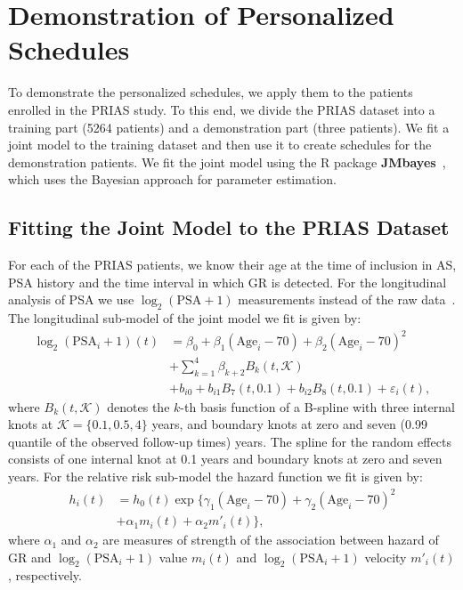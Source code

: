 \section{Demonstration of Personalized Schedules}
\label{c2:sec:pers_schedule_PRIAS}
To demonstrate the personalized schedules, we apply them to the patients enrolled in the PRIAS study. To this end, we divide the PRIAS dataset into a training part (5264 patients) and a demonstration part (three patients). We fit a joint model to the training dataset and then use it to create schedules for the demonstration patients. We fit the joint model using the R package \textbf{JMbayes}~\citep{rizopoulosJMbayes}, which uses the Bayesian approach for parameter estimation.

\subsection{Fitting the Joint Model to the PRIAS Dataset}
\label{c2:subsec:jm_fit_prias}
For each of the PRIAS patients, we know their age at the time of inclusion in AS, PSA history and the time interval in which GR is detected. For the longitudinal analysis of PSA we use $\log_2 (\mbox{PSA} + 1)$ measurements instead of the raw data~\citep{lin2000latent,pearson1994mixed}. The longitudinal sub-model of the joint model we fit is given by:
\begin{equation}
\label{c2:eq:long_model_prias}
\begin{split}
    \log_2 (\mbox{PSA}_i + 1)(t) &= \beta_0 + \beta_1 (\mbox{Age}_i-70) + \beta_2 (\mbox{Age}_i-70)^2\\ &+ \sum_{k=1}^4 \beta_{k+2} B_k(t,\mathcal{K})\\ 
    &+  b_{i0} + b_{i1} B_7(t, 0.1) + b_{i2} B_8(t, 0.1) +
    \varepsilon_i(t),
\end{split}
\end{equation}
where $B_k(t, \mathcal{K})$ denotes the $k$-th basis function of a B-spline with three internal knots at $\mathcal{K} =\{0.1, 0.5, 4\}$ years, and boundary knots at zero and seven (0.99 quantile of the observed follow-up times) years. The spline for the random effects consists of one internal knot at 0.1 years and boundary knots at zero and seven years. For the relative risk sub-model the hazard function we fit is given by:
\begin{equation}
\label{c2:eq:hazard_prias}
\begin{split}
h_i(t) &= h_0(t) \exp\big\{\gamma_1 (\mbox{Age}_i-70) + \gamma_2 (\mbox{Age}_i-70)^2 \\&+ \alpha_1 m_i(t) + \alpha_2 m'_i(t)\big\},
\end{split}
\end{equation}
where $\alpha_1$ and $\alpha_2$ are measures of strength of the association between hazard of GR and $\log_2 (\mbox{PSA}_i + 1)$ value $m_i(t)$ and $\log_2 (\mbox{PSA}_i + 1)$ velocity $m'_i(t)$, respectively.

